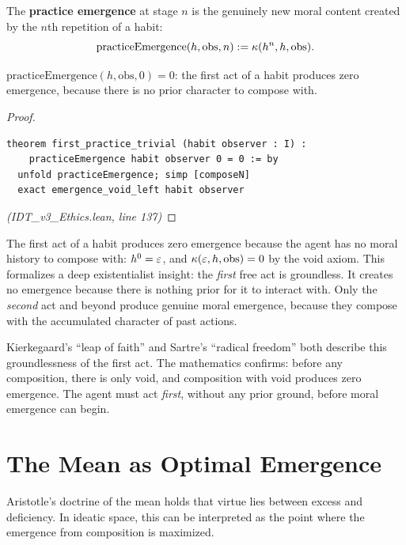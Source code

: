 \begin{definition}
\label{def:practice-emergence}
The \textbf{practice emergence} at stage $n$ is the genuinely new moral
content created by the $n$th repetition of a habit:
\[
  \mathrm{practiceEmergence}(h, \mathrm{obs}, n) := \kappa(h^n, h, \mathrm{obs}).
\]
\end{definition}

\begin{theorem}
\label{thm:first-practice}
$\mathrm{practiceEmergence}(h, \mathrm{obs}, 0) = 0$: the first act of a habit
produces zero emergence, because there is no prior character to compose with.
\end{theorem}

\begin{proof}
\begin{lstlisting}
theorem first_practice_trivial (habit observer : I) :
    practiceEmergence habit observer 0 = 0 := by
  unfold practiceEmergence; simp [composeN]
  exact emergence_void_left habit observer
\end{lstlisting}
\textit{(IDT\_v3\_Ethics.lean, line 137)}
\end{proof}

\begin{interpretation}
The first act of a habit produces zero emergence because the agent has no
moral history to compose with: $h^0 = \varepsilon$, and $\kappa(\varepsilon, h, \mathrm{obs})
= 0$ by the void axiom. This formalizes a deep existentialist insight: the
\emph{first} free act is groundless. It creates no emergence because there
is nothing prior for it to interact with. Only the \emph{second} act and
beyond produce genuine moral emergence, because they compose with the
accumulated character of past actions.

Kierkegaard's ``leap of faith'' and Sartre's ``radical freedom'' both
describe this groundlessness of the first act. The mathematics confirms:
before any composition, there is only void, and composition with void
produces zero emergence. The agent must act \emph{first}, without any
prior ground, before moral emergence can begin.
\end{interpretation}

\section{The Mean as Optimal Emergence}

Aristotle's doctrine of the mean holds that virtue lies between excess and
deficiency. In ideatic space, this can be interpreted as the point where the
emergence from composition is maximized.

